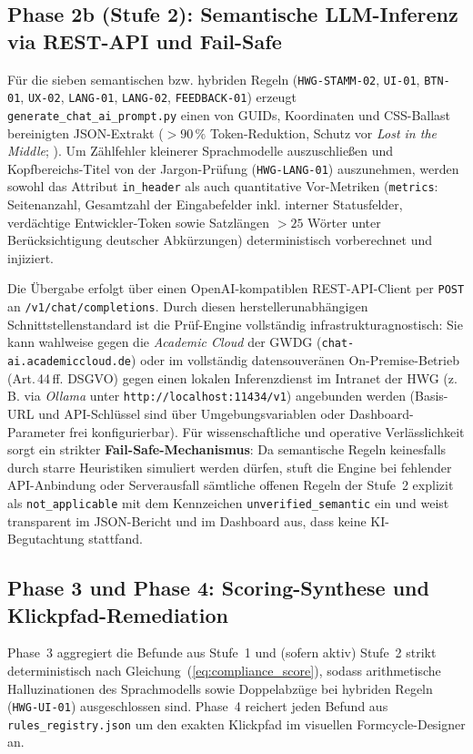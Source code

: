 \subsection{Phase 2b (Stufe 2): Semantische LLM-Inferenz via REST-API und Fail-Safe}
Für die sieben semantischen bzw. hybriden Regeln (\texttt{HWG-STAMM-02}, \texttt{UI-01}, \texttt{BTN-01}, \texttt{UX-02}, \texttt{LANG-01}, \texttt{LANG-02}, \texttt{FEEDBACK-01}) erzeugt \texttt{generate\_chat\_ai\_prompt.py} einen von GUIDs, Koordinaten und CSS-Ballast bereinigten JSON-Extrakt ($>90\,\%$ Token-Reduktion, Schutz vor \textit{Lost in the Middle}; \cite{cha2026design, duan2024generating}). Um Zählfehler kleinerer Sprachmodelle auszuschließen und Kopfbereichs-Titel von der Jargon-Prüfung (\texttt{HWG-LANG-01}) auszunehmen, werden sowohl das Attribut \texttt{in\_header} als auch quantitative Vor-Metriken (\texttt{metrics}: Seitenanzahl, Gesamtzahl der Eingabefelder inkl. interner Statusfelder, verdächtige Entwickler-Token sowie Satzlängen $>25$ Wörter unter Berücksichtigung deutscher Abkürzungen) deterministisch vorberechnet und injiziert.

Die Übergabe erfolgt über einen Open\-AI-kom\-pa\-ti\-blen REST-API-Client per \texttt{POST} an \texttt{/v1/chat/completions}. Durch diesen herstellerunabhängigen Schnittstellenstandard ist die Prüf-Engine vollständig infrastrukturagnostisch: Sie kann wahlweise gegen die \textit{Academic Cloud} der GWDG (\texttt{chat-ai.academiccloud.de}) oder im vollständig datensouveränen On-Premise-Betrieb (Art.\,44\,ff. DSGVO) gegen einen lokalen Inferenzdienst im Intranet der HWG (z.\,B. via \textit{Ollama} unter \texttt{http://localhost:11434/v1}) angebunden werden (Basis-URL und API-Schlüssel sind über Umgebungsvariablen oder Dashboard-Parameter frei konfigurierbar). Für wissenschaftliche und operative Verlässlichkeit sorgt ein strikter \textbf{Fail-Safe-Mechanismus}: Da semantische Regeln keinesfalls durch starre Heuristiken simuliert werden dürfen, stuft die Engine bei fehlender API-Anbindung oder Serverausfall sämtliche offenen Regeln der Stufe~2 explizit als \texttt{not\_\allowbreak applicable} mit dem Kennzeichen \texttt{unverified\_\allowbreak semantic} ein und weist transparent im JSON-Bericht und im Dashboard aus, dass keine KI-Begutachtung stattfand.

\subsection{Phase 3 und Phase 4: Scoring-Synthese und Klickpfad-Remediation}
Phase~3 aggregiert die Befunde aus Stufe~1 und (sofern aktiv) Stufe~2 strikt deterministisch nach Gleichung~(\ref{eq:compliance_score}), sodass arithmetische Halluzinationen des Sprachmodells sowie Doppelabzüge bei hybriden Regeln (\texttt{HWG-UI-01}) ausgeschlossen sind. Phase~4 reichert jeden Befund aus \texttt{rules\_registry.json} um den exakten Klickpfad im visuellen Formcycle-Designer an.

